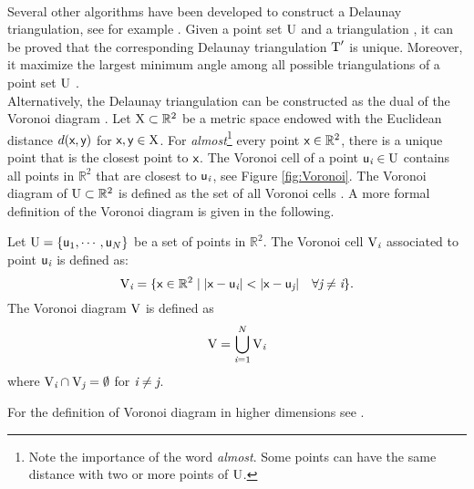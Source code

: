 \\ \indent Several other algorithms have been developed to construct a Delaunay triangulation, see for example \cite{lee1980two, renka1997algorithm}.
 Given a point set $\mbox{$\textup{U}$}$ and a triangulation , it can be proved that the corresponding Delaunay triangulation $\mbox{$\textup{T}$}^\prime$ is unique. Moreover, it maximize the largest minimum angle among all possible triangulations of a point set $\mbox{$\textup{U}$}$ \cite{press2007numerical}.
\\ \indent Alternatively, the Delaunay triangulation can be constructed as the dual of the Voronoi diagram \cite{fortune1992voronoi}. Let $\mbox{$\textup{X}$}\subset\mathbb{R}^2$ be a metric space endowed with the Euclidean distance $d(\textsf{x}, \textsf{y})$ for $\textsf{x}, \textsf{y}\in \mbox{$\textup{X}$}$. For \textit{almost}\footnote{Note the importance of the word \textit{almost}. Some points can have the same distance with two or more points of $\mbox{$\textup{U}$}$.} every point $\textsf{x}\in \mathbb{R}^2$, there is a unique point that is the closest point to $\textsf{x}$. The Voronoi cell of a point $\textsf{u}_{\textit{i}}\in \mbox{$\textup{U}$}$ contains all points in $\mathbb{R}^2$ that are closest to $\textsf{u}_{\textit{i}}$, see Figure \ref{fig:Voronoi}. The Voronoi diagram of $\mbox{$\textup{U}$}\subset \mathbb{R}^2$ is defined as the set of all Voronoi cells \cite{cazals2005conformal}. A more formal definition of the Voronoi diagram is given in the following.
\begin{defn}
Let $\mbox{$\textup{U}$}=\{\textsf{u}_1,\cdots,\textsf{u}_N\}$ be a set of points in $\mathbb{R}^2$. The Voronoi cell $\mbox{$\textup{V}$}_{\textit{i}}$ associated to point $\textsf{u}_{\textit{i}}$ is defined as:
\begin{equation}
\mbox{\insieme{V}}_\variabile{i}=\{\point{x}\in \mathbb{R}^2\; | \;|\point{x}-\point{u}_\variabile{i}|<|\point{x}-\point{u}_\variabile{j}| \quad \forall \variabile{j}\neq \variabile{i} \}.
\end{equation}
The Voronoi diagram $\mbox{$\textup{V}$}$ is defined as 
\begin{equation}
\mbox{$\textup{V}$} = \bigcup_{\textit{i}=1}^N \mbox{$\textup{V}$}_{\textit{i}}
\end{equation}
 where $\mbox{$\textup{V}$}_{\textit{i}}\cap \mbox{$\textup{V}$}_{\textit{j}}= \emptyset$ for $\textit{i}\neq\textit{j}$.
\end{defn}
For the definition of Voronoi diagram in higher dimensions see \cite{brown1979voronoi}.
